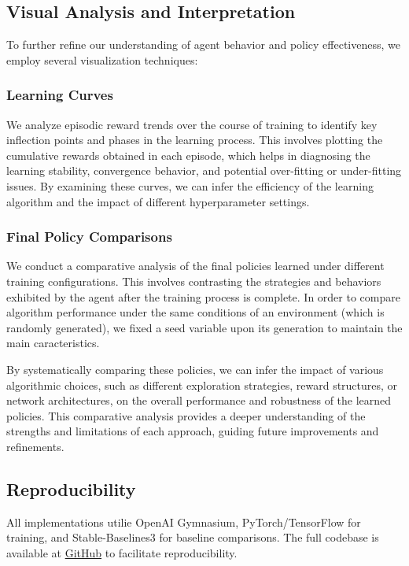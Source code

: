 \documentclass[../CSC_52081_EP.tex]{subfiles}
\begin{document}
\subsection{Visual Analysis and Interpretation}
To further refine our understanding of agent behavior and policy effectiveness, we employ several visualization techniques:

\subsubsection{Learning Curves}
We analyze episodic reward trends over the course of training to identify key inflection points and phases in the learning process. This involves plotting the cumulative rewards obtained in each episode, which helps in diagnosing the learning stability, convergence behavior, and potential over-fitting or under-fitting issues. By examining these curves, we can infer the efficiency of the learning algorithm and the impact of different hyperparameter settings.


\subsubsection{Final Policy Comparisons}
We conduct a comparative analysis of the final policies learned under different training configurations. This involves contrasting the strategies and behaviors exhibited by the agent after the training process is complete. In order to compare algorithm performance under the same conditions of an environment (which is randomly generated), we fixed a seed variable upon its generation to maintain the main caracteristics.

By systematically comparing these policies, we can infer the impact of various algorithmic choices, such as different exploration strategies, reward structures, or network architectures, on the overall performance and robustness of the learned policies. This comparative analysis provides a deeper understanding of the strengths and limitations of each approach, guiding future improvements and refinements.


\subsection{Reproducibility}
All implementations utilie OpenAI Gymnasium, PyTorch/TensorFlow for training, and Stable-Baselines3 for baseline comparisons. The full codebase is available at \href{https://github.com/tr0fin0/ensta_CSC_52081_EP_project}{GitHub} to facilitate reproducibility.
\end{document}
